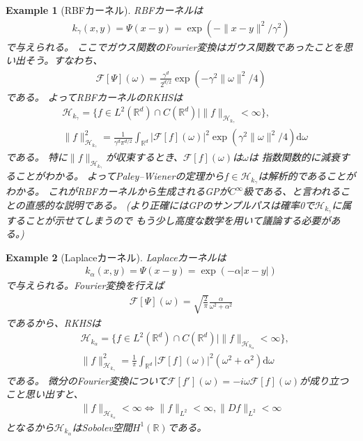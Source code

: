 \documentclass{article}
\newcommand{\diff}{\mathrm{d}}
\newtheorem{eg}{Example}[section]
\begin{document}
\begin{eg}[RBFカーネル]
RBFカーネルは
\begin{align}
    k_{\gamma}(x,y)=\Psi(x-y)=\exp(-\|x-y\|^{2}/\gamma^{2})
\end{align}
で与えられる。
ここでガウス関数のFourier変換はガウス関数であったことを思い出そう。すなわち、
\begin{align}
    \mathcal{F}[\Psi](\omega)=\frac{\gamma^{d}}{2^{d/2}}\exp(-\gamma^{2}\|\omega\|^{2}/4)
\end{align}
である。
よってRBFカーネルのRKHSは
\begin{align}
    & \mathcal{H}_{k_{\gamma}}=\{f\in L^{2}(\mathbb{R}^{d})\cap C(\mathbb{R}^{d}) \mid \|f\|_{\mathcal{H}_{k_{\gamma}}} < \infty \},\\
    & \|f\|^{2}_{\mathcal{H}_{k_{\gamma}}}=\frac{1}{\gamma^{d}\pi^{d/2}}\int_{\mathbb{R}^{d}}|\mathcal{F}[f](\omega)|^{2}\exp(\gamma^{2}\|\omega\|^{2}/4)\diff\omega
\end{align}
である。
特に$\|f\|_{\mathcal{H}_{k_{\gamma}}}$が収束するとき、$\mathcal{F}[f](\omega)$は$\omega$は
指数関数的に減衰することがわかる。
よってPaley–Wienerの定理から$f\in\mathcal{H}_{k_{\gamma}}$は解析的であることがわかる。
これがRBFカーネルから生成されるGPが$C^{\infty}$級である、と言われることの直感的な説明である。
(より正確にはGPのサンプルパスは確率0で$\mathcal{H}_{k_{\gamma}}$に属することが示せてしまうので
もう少し高度な数学を用いて議論する必要がある。)
\end{eg}

\begin{eg}[Laplaceカーネル]
Laplaceカーネルは
\begin{align}
    k_{\alpha}(x,y)=\Psi(x-y)=\exp(-\alpha|x-y|)
\end{align}
で与えられる。Fourier変換を行えば
\begin{align}
    \mathcal{F}[\Psi](\omega)=\sqrt{\frac{2}{\pi}}\frac{\alpha}{\omega^{2}+\alpha^{2}}
\end{align}
であるから、RKHSは
\begin{align}
    & \mathcal{H}_{k_{\alpha}}=\{f\in L^{2}(\mathbb{R}^{d})\cap C(\mathbb{R}^{d}) \mid \|f\|_{\mathcal{H}_{k_{\alpha}}} < \infty \},\\
    & \|f\|^{2}_{\mathcal{H}_{k_{\gamma}}}=\frac{1}{\pi}\int_{\mathbb{R}^{d}}|\mathcal{F}[f](\omega)|^{2}(\omega^{2}+\alpha^{2})\diff\omega
\end{align}
である。
微分のFourier変換について$\mathcal{F}[f'](\omega)=-i\omega\mathcal{F}[f](\omega)$が成り立つこと思い出すと、
\begin{align}
    \|f\|_{\mathcal{H}_{k_{\alpha}}}<\infty
    \Leftrightarrow \|f\|_{L^{2}}<\infty, \|Df\|_{L^{2}}<\infty
\end{align}
となるから$\mathcal{H}_{k_{\alpha}}$はSobolev空間$H^{1}(\mathbb{R})$である。
\end{eg}
\end{document}
